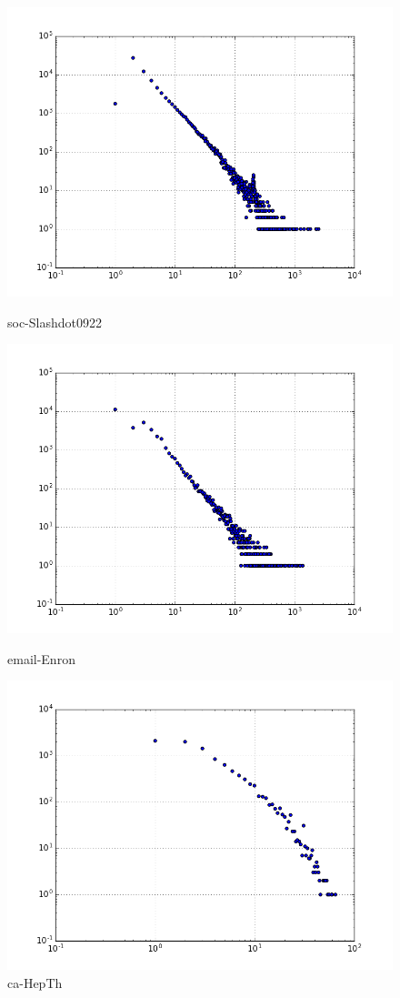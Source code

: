 \begin{figure}[H]
  \includegraphics[width=\linewidth]{img/slashDot09/degree_dist.png}
  \caption*{soc-Slashdot0922}
\endminipage\hfill
{}
  \includegraphics[width=\linewidth]{img/email/degree_dist.png}
  \caption*{email-Enron}
\endminipage\hfill
{}
  \includegraphics[width=\linewidth]{img/ca-HepTh/degree_dist.png}
  \caption*{ca-HepTh}
\endminipage
\end{figure}

